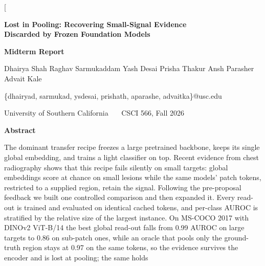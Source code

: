 \documentclass[10pt,letterpaper,twocolumn]{article}
\begin{document}
\makeatletter
\twocolumn[
\begin{@twocolumnfalse}
\begin{center}
  {\LARGE\bfseries Lost in Pooling: Recovering Small-Signal Evidence\\[3pt]
   Discarded by Frozen Foundation Models\par}
  \vspace{5pt}
  {\large\bfseries Midterm Report\par}
  \vspace{12pt}
  {\normalsize Dhairya Shah \quad Raghav Sarmukaddam \quad Yash Desai \quad
  Prisha Thakur \quad Ansh Parasher \quad Advait Kale\par}
  \vspace{4pt}
  {\small\ttfamily \{dhairyad, sarmukad, ysdesai, prishath, aparashe, advaitka\}@usc.edu\par}
  \vspace{4pt}
  {\small University of Southern California \ \textbullet\ \ CSCI 566, Fall 2026\par}
  \vspace{16pt}
  {\normalsize\bfseries Abstract\par}
  \vspace{4pt}
\end{center}
\begin{list}{}{\setlength{\leftmargin}{0.55in}\setlength{\rightmargin}{0.55in}}\item\relax
\noindent
The dominant transfer recipe freezes a large pretrained backbone, keeps its single global
embedding, and trains a light classifier on top. Recent evidence from chest radiography shows
that this recipe fails silently on small targets: global embeddings score at chance on small
lesions while the same models' patch tokens, restricted to a supplied region, retain the
signal. Following the pre-proposal feedback we built one controlled comparison and then
expanded it. Every read-out is trained and evaluated on identical cached tokens, and
per-class AUROC is stratified by the relative size of the largest instance. On MS-COCO 2017
with DINOv2 ViT-B/14 the best global read-out falls from 0.99 AUROC on large targets to 0.86
on sub-patch ones, while an oracle that pools only the ground-truth region stays at 0.97 on
the same tokens, so the evidence survives the encoder and is lost at pooling; the same holds

\end{list}
\end{@twocolumnfalse}
\end{document}
